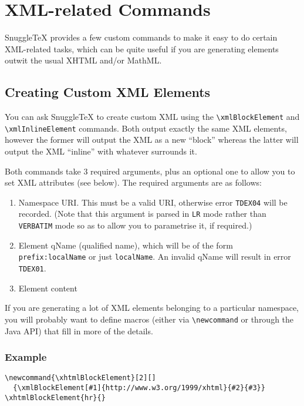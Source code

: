 
\section*{XML-related Commands}

SnuggleTeX provides a few custom commands to make it
easy to do certain XML-related tasks, which can be quite
useful if you are generating elements outwit the usual
XHTML and/or MathML.

\subsection*{Creating Custom XML Elements}

You can ask SnuggleTeX to create custom XML using the
\verb|\xmlBlockElement| and \verb|\xmlInlineElement|
commands. Both output exactly the same XML elements, however the former will
output the XML as a new ``block'' whereas the latter will output the XML
``inline'' with whatever surrounds it.

Both commands take 3 required arguments, plus an
optional one to allow you to set XML attributes
(see below). The required arguments are as follows:

\begin{enumerate}
  \item Namespace URI. This must be a valid URI, otherwise
    error \verb|TDEX04| will be recorded. 
    (Note that this argument is parsed in \verb|LR| mode
    rather than \verb|VERBATIM| mode so as to allow you to
    parametrise it, if required.)
  \item Element qName (qualified name), which will be of
    the form \verb|prefix:localName| or just
    \verb|localName|. An invalid qName will result in
    error \verb|TDEX01|.
  \item Element content
\end{enumerate}

If you are generating a lot of XML elements belonging
to a particular namespace, you will probably want to
define macros (either via \verb|\newcommand| or
through the Java API) that fill in more of the details.

\subsubsection*{Example}

\begin{verbatim}
\newcommand{\xhtmlBlockElement}[2][]
  {\xmlBlockElement[#1]{http://www.w3.org/1999/xhtml}{#2}{#3}}
\xhtmlBlockElement{hr}{}
\end{verbatim}

